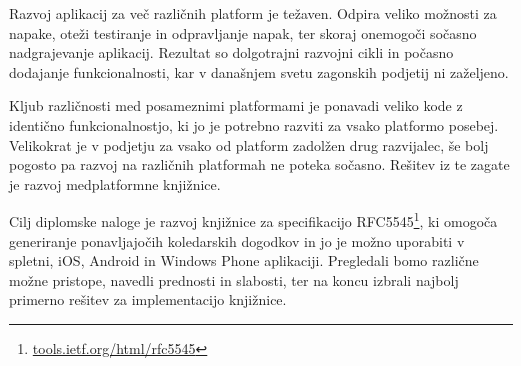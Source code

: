 








\begin{Povzetek}

Razvoj aplikacij za več različnih platform je težaven. Odpira veliko možnosti za napake, oteži testiranje in odpravljanje napak, ter skoraj onemogoči sočasno nadgrajevanje aplikacij. Rezultat so dolgotrajni razvojni cikli in počasno dodajanje funkcionalnosti, kar v današnjem svetu zagonskih podjetij ni zaželjeno.

Kljub različnosti med posameznimi platformami je ponavadi veliko kode z identično funkcionalnostjo, ki jo je potrebno razviti za vsako platformo posebej. Velikokrat je v podjetju za vsako od platform zadolžen drug razvijalec, še bolj pogosto pa razvoj na različnih platformah ne poteka sočasno. Rešitev iz te zagate je razvoj medplatformne knjižnice.

Cilj diplomske naloge je razvoj knjižnice za specifikacijo RFC5545\footnote{\href{http://tools.ietf.org/html/rfc5545}{tools.ietf.org/html/rfc5545}}, ki omogoča generiranje ponavljajočih koledarskih dogodkov in jo je možno uporabiti v spletni, iOS, Android in Windows Phone aplikaciji. Pregledali bomo različne možne pristope, navedli prednosti in slabosti, ter na koncu izbrali najbolj primerno rešitev za implementacijo knjižnice.
\end{Povzetek}










